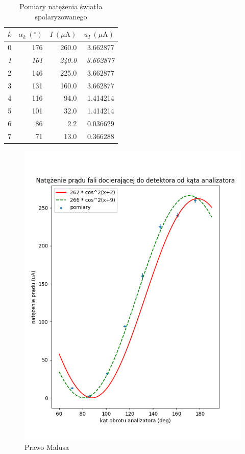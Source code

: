 \documentclass[a4paper]{article}
\begin{document}
\begin{table}[h]
\centering
\begin{tabular}{rrrr}
\toprule
 $k$ &  $\alpha_k \ ({}^\circ)$ &  $I \ (\mu\text{A})$ &  $u_I \ (\mu \text{A})$ \\
\midrule
 0 &       176 &   260.0 &         3.662877 \\
 \textit{1} & 	   \textit{161} &   \textit{240.0} &         \textit{3.662877} \\
 2 &       146 &   225.0 &         3.662877 \\
 3 &       131 &   160.0 &         3.662877 \\
 4 &       116 &    94.0 &         1.414214 \\
 5 &       101 &    32.0 &         1.414214 \\
 6 &        86 &     2.2 &         0.036629 \\
 7 &        71 &    13.0 &         0.366288 \\
\bottomrule
\end{tabular}
\caption{Pomiary natężenia światła spolaryzowanego}
\label{malus-pomiary}
\end{table}



\begin{figure}[h]
\centering
\includegraphics[scale=0.6]{malus.png}
\caption{Prawo Malusa}
\label{malus-wykres}
\end{figure}
\end{document}
